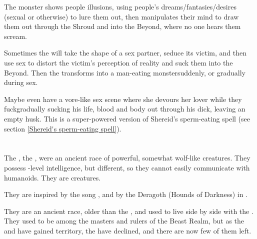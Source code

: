 The monster shows people illusions, using people's dreams/fantasies/desires (sexual or otherwise) to lure them out, then manipulates their mind to draw them out through the Shroud and into the Beyond, where no one hears them scream.

Sometimes the \succubus{} will take the shape of a sex partner, seduce its victim, and then use sex to distort the victim's perception of reality and suck them into the Beyond. Then the \succubus{} transforms into a man-eating monster\dash suddenly, or gradually during sex. 

Maybe even have a vore-like sex scene where she devours her lover while they fuck\dash gradually sucking his life, blood and body out through his dick, leaving an empty husk. This is a super-powered version of Shereid's sperm-eating spell (see section \ref{Shereid's sperm-eating spell}).

















\section{\Vorcanth}
\index{\Vorcanth}
The \MoonWolves{}, the , were an ancient race of powerful, somewhat wolf-like creatures. 
They possess \human-level intelligence, but different, so they cannot easily communicate with humanoids. 
They are \Wylde{} creatures.

They are inspired by the song , and by the Deragoth (Hounds of Darkness) in \cite{StevenEriksonIanCameronEsslemont:MalazanBookoftheFallen}. 

They are an ancient race, older than the \nephilim, and used to live side by side with the \ophidians. 
They used to be among the masters and rulers of the Beast Realm, but as the \dragons{} and \resphain{} have gained territory, the \moonwolves{} have declined, and there are now few of them left.







